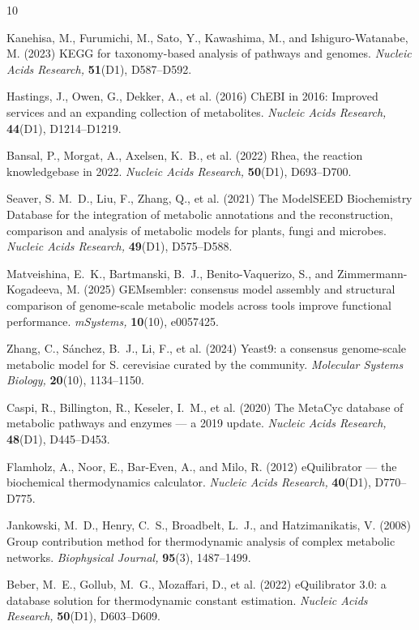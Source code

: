 \documentclass[unnumsec,webpdf,modern,large]{oup-authoring-template}
\begin{document}
\begin{thebibliography}{10}

Kanehisa, M., Furumichi, M., Sato, Y., Kawashima, M., and Ishiguro-Watanabe, M.
  (2023)
{KEGG} for taxonomy-based analysis of pathways and genomes.
{\em Nucleic Acids Research,} {\bf 51}(D1), D587--D592.

Hastings, J., Owen, G., Dekker, A., et al. (2016)
{ChEBI} in 2016: Improved services and an expanding collection of metabolites.
{\em Nucleic Acids Research,} {\bf 44}(D1), D1214--D1219.

Bansal, P., Morgat, A., Axelsen, K.~B., et al. (2022)
{Rhea}, the reaction knowledgebase in 2022.
{\em Nucleic Acids Research,} {\bf 50}(D1), D693--D700.

Seaver, S. M.~D., Liu, F., Zhang, Q., et al. (2021)
The {ModelSEED} Biochemistry Database for the integration of metabolic
  annotations and the reconstruction, comparison and analysis of metabolic
  models for plants, fungi and microbes.
{\em Nucleic Acids Research,} {\bf 49}(D1), D575--D588.

Matveishina, E.~K., Bartmanski, B.~J., Benito-Vaquerizo, S., and
  Zimmermann-Kogadeeva, M. (2025)
{GEMsembler}: consensus model assembly and structural comparison of
  genome-scale metabolic models across tools improve functional performance.
{\em mSystems,} {\bf 10}(10), e0057425.

Zhang, C., S{\'a}nchez, B.~J., Li, F., et al. (2024)
{Yeast9}: a consensus genome-scale metabolic model for {S. cerevisiae} curated
  by the community.
{\em Molecular Systems Biology,} {\bf 20}(10), 1134--1150.

Caspi, R., Billington, R., Keseler, I.~M., et al. (2020)
The {MetaCyc} database of metabolic pathways and enzymes --- a 2019 update.
{\em Nucleic Acids Research,} {\bf 48}(D1), D445--D453.

Flamholz, A., Noor, E., Bar-Even, A., and Milo, R. (2012)
{eQuilibrator} --- the biochemical thermodynamics calculator.
{\em Nucleic Acids Research,} {\bf 40}(D1), D770--D775.

Jankowski, M.~D., Henry, C.~S., Broadbelt, L.~J., and Hatzimanikatis, V. (2008)
Group contribution method for thermodynamic analysis of complex metabolic
  networks.
{\em Biophysical Journal,} {\bf 95}(3), 1487--1499.

Beber, M.~E., Gollub, M.~G., Mozaffari, D., et al. (2022)
{eQuilibrator} 3.0: a database solution for thermodynamic constant estimation.
{\em Nucleic Acids Research,} {\bf 50}(D1), D603--D609.


\end{thebibliography}
\end{document}

